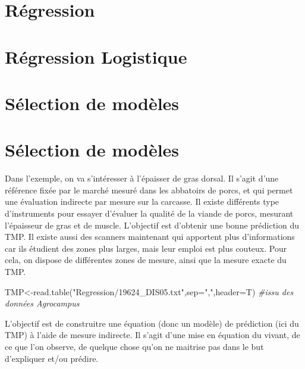 \documentclass[
]{article}
\newenvironment{Shaded}{\begin{snugshade}}{\end{snugshade}}
\newcommand{\AttributeTok}[1]{\textcolor[rgb]{0.77,0.63,0.00}{#1}}
\newcommand{\CommentTok}[1]{\textcolor[rgb]{0.56,0.35,0.01}{\textit{#1}}}
\newcommand{\FunctionTok}[1]{\textcolor[rgb]{0.00,0.00,0.00}{#1}}
\newcommand{\NormalTok}[1]{#1}
\newcommand{\OtherTok}[1]{\textcolor[rgb]{0.56,0.35,0.01}{#1}}
\newcommand{\StringTok}[1]{\textcolor[rgb]{0.31,0.60,0.02}{#1}}
\begin{document}
\pagebreak

\hypertarget{ruxe9gression}{%
\section{Régression}\label{ruxe9gression}}

\hypertarget{ruxe9gression-logistique}{%
\section{Régression Logistique}\label{ruxe9gression-logistique}}

\hypertarget{suxe9lection-de-moduxe8les}{%
\section{Sélection de modèles}\label{suxe9lection-de-moduxe8les}}

\hypertarget{suxe9lection-de-moduxe8les-1}{%
\section{Sélection de modèles}\label{suxe9lection-de-moduxe8les-1}}

Dans l'exemple, on va s'intéresser à l'épaisser de gras dorsal. Il
s'agit d'une référence fixée par le marché mesuré dans les abbatoirs de
porcs, et qui permet une évaluation indirecte par mesure sur la
carcasse. Il existe différents type d'instruments pour essayer d'évaluer
la qualité de la viande de porcs, mesurant l'épaisseur de gras et de
muscle. L'objectif est d'obtenir une bonne prédiction du TMP. Il existe
aussi des scanners maintenant qui apportent plus d'informations car ils
étudient des zones plus larges, mais leur emploi est plus couteux. Pour
cela, on dispose de différentes zones de mesure, ainsi que la mesure
exacte du TMP.

\begin{Shaded}
\begin{Highlighting}[]
\NormalTok{TMP}\OtherTok{\textless{}{-}}\FunctionTok{read.table}\NormalTok{(}\StringTok{"Regression/19624\_DIS05.txt"}\NormalTok{,}\AttributeTok{sep=}\StringTok{","}\NormalTok{,}\AttributeTok{header=}\NormalTok{T) }\CommentTok{\#issu des données Agrocampus}
\end{Highlighting}
\end{Shaded}

L'objectif est de construitre une équation (donc un modèle) de
prédiction (ici du TMP) à l'aide de mesure indirecte. Il s'agit d'une
mise en équation du vivant, de ce que l'on observe, de quelque chose
qu'on ne maitrise pas dans le but d'expliquer et/ou prédire.
\end{document}
